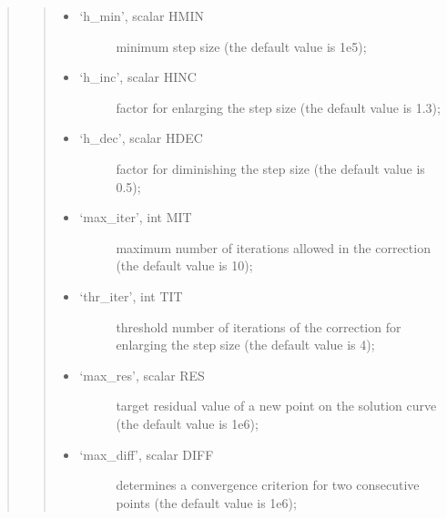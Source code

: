 \documentclass[a4paper,11pt,english]{sphinxmanual}
\begin{document}
\begin{quote}
\begin{quote}
\begin{itemize}
\begin{description}
\end{description}

\item {} \begin{description}
\item[{‘h\_min’, scalar HMIN}] \leavevmode
minimum step size (the default value is 1e\sphinxhyphen{}5);

\end{description}

\item {} \begin{description}
\item[{‘h\_inc’, scalar HINC}] \leavevmode
factor for enlarging the step size (the default value is 1.3);

\end{description}

\item {} \begin{description}
\item[{‘h\_dec’, scalar HDEC}] \leavevmode
factor for diminishing the step size (the default value is 0.5);

\end{description}

\item {} \begin{description}
\item[{‘max\_iter’, int MIT}] \leavevmode
maximum number of iterations allowed in the correction (the default
value is 10);

\end{description}

\item {} \begin{description}
\item[{‘thr\_iter’, int TIT}] \leavevmode
threshold number of iterations of the correction for enlarging the
step size (the default value is 4);

\end{description}

\item {} \begin{description}
\item[{‘max\_res’, scalar RES}] \leavevmode
target residual value of a new point on the solution curve (the
default value is 1e\sphinxhyphen{}6);

\end{description}

\item {} \begin{description}
\item[{‘max\_diff’, scalar DIFF}] \leavevmode
determines a convergence criterion for two consecutive points (the
default value is 1e\sphinxhyphen{}6);


\end{description}
\end{itemize}
\end{quote}
\end{quote}
\end{document}

